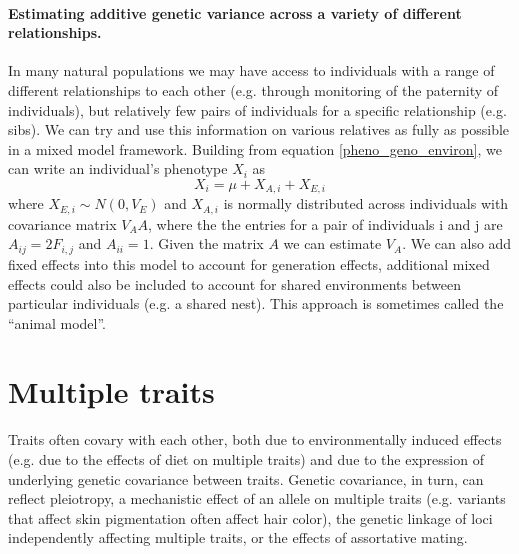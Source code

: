 \paragraph{Estimating additive genetic variance across a variety of
  different relationships.}

In many natural populations we may have access to individuals with a
range of different relationships to each other (e.g. through monitoring
of the paternity of individuals), but relatively few pairs of individuals for a specific relationship (e.g. sibs). We can try and use this information on various relatives as
fully as possible in a mixed model framework. Building from equation
\ref{pheno_geno_environ}, we can write an individual's phenotype $X_i$
 as 
\begin{equation}
X_i =  \mu  + X_{A,i} + X_{E,i} 
\end{equation}
where $X_{E,i} \sim N(0,V_E)$  and $X_{A,i}$ is normally distributed across
individuals with covariance matrix $V_A A$, where the the entries for
a pair of individuals i and j are 
$A_{ij}= 2 F_{i,j}$ and $A_{ii}= 1$. Given the matrix $A$ we can estimate $V_A$. We can
also add fixed effects into this model to account for generation
effects, additional mixed effects could also be included to account
for shared environments between particular individuals (e.g. a shared nest).
This approach is sometimes called the ``animal model''. 


\section{Multiple traits}

Traits often covary with each other, both due to environmentally
induced effects (e.g. due to the effects of diet on multiple traits)
and due to the expression of underlying genetic covariance between
traits. Genetic covariance, in turn, can reflect pleiotropy, a
mechanistic effect of an allele on multiple traits (e.g. variants that
affect skin pigmentation often affect hair color), the genetic
linkage of loci independently affecting multiple traits, or the effects of assortative mating. 

